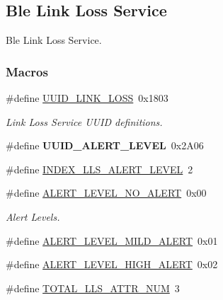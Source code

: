 \hypertarget{group___b_l_e___l_l_s}{}\subsection{Ble Link Loss Service}
\label{group___b_l_e___l_l_s}


Ble Link Loss Service.  


\subsubsection*{Macros}
\begin{DoxyCompactItemize}
\item 
\#define \hyperlink{group___b_l_e___l_l_s_gacd94b0a6c2acb12daf69dad639f55790}{U\+U\+I\+D\+\_\+\+L\+I\+N\+K\+\_\+\+L\+O\+SS}~0x1803\hypertarget{group___b_l_e___l_l_s_gacd94b0a6c2acb12daf69dad639f55790}{}\label{group___b_l_e___l_l_s_gacd94b0a6c2acb12daf69dad639f55790}

\begin{DoxyCompactList}\small\item\em Link Loss Service U\+U\+ID definitions. \end{DoxyCompactList}\item 
\#define {\bfseries U\+U\+I\+D\+\_\+\+A\+L\+E\+R\+T\+\_\+\+L\+E\+V\+EL}~0x2\+A06\hypertarget{group___b_l_e___l_l_s_ga1bbf6424686c00ceecb1a7bf7f5cbef3}{}\label{group___b_l_e___l_l_s_ga1bbf6424686c00ceecb1a7bf7f5cbef3}

\item 
\#define \hyperlink{group___b_l_e___l_l_s_ga52be9a71178b24e3e2a3c3f323213dd7}{I\+N\+D\+E\+X\+\_\+\+L\+L\+S\+\_\+\+A\+L\+E\+R\+T\+\_\+\+L\+E\+V\+EL}~2
\item 
\#define \hyperlink{group___b_l_e___l_l_s_ga2b9c170b858bc7776ffda41d20a57b12}{A\+L\+E\+R\+T\+\_\+\+L\+E\+V\+E\+L\+\_\+\+N\+O\+\_\+\+A\+L\+E\+RT}~0x00
\begin{DoxyCompactList}\small\item\em Alert Levels. \end{DoxyCompactList}\item 
\#define \hyperlink{group___b_l_e___l_l_s_gad54bc05bfbd668d20c97f740e5cad14c}{A\+L\+E\+R\+T\+\_\+\+L\+E\+V\+E\+L\+\_\+\+M\+I\+L\+D\+\_\+\+A\+L\+E\+RT}~0x01
\item 
\#define \hyperlink{group___b_l_e___l_l_s_gaa6d896950cabe95f73e332ff71bb4ab0}{A\+L\+E\+R\+T\+\_\+\+L\+E\+V\+E\+L\+\_\+\+H\+I\+G\+H\+\_\+\+A\+L\+E\+RT}~0x02
\item 
\#define \hyperlink{group___b_l_e___l_l_s_ga4d951c4df4521247bcd29bc66c67822a}{T\+O\+T\+A\+L\+\_\+\+L\+L\+S\+\_\+\+A\+T\+T\+R\+\_\+\+N\+UM}~3
\end{DoxyCompactItemize}
